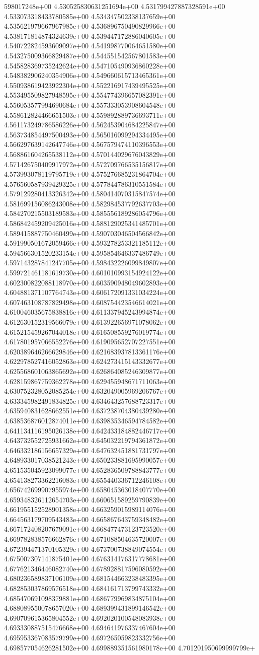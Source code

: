 598017248e+00	4.530525830631251694e+00	4.531799427887328591e+00	4.533073318433780585e+00	4.534347502338137659e+00	4.535621979667967985e+00	4.536896750490829966e+00	4.538171814874324639e+00	4.539447172886040605e+00	4.540722824593609097e+00	4.541998770064651580e+00	4.543275009366829487e+00	4.544551542567801583e+00	4.545828369735242624e+00	4.547105490936860228e+00	4.548382906240354906e+00	4.549660615713465361e+00	4.550938619423922304e+00	4.552216917439495525e+00	4.553495509827948595e+00	4.554774396657082391e+00	4.556053577994690684e+00	4.557333053908604548e+00	4.558612824466651503e+00	4.559892889736693711e+00	4.561173249786586226e+00	4.562453904684225847e+00	4.563734854497500493e+00	4.565016099294334495e+00	4.566297639142647746e+00	4.567579474110396553e+00	4.568861604265538112e+00	4.570144029676043829e+00	4.571426750409917972e+00	4.572709766535156817e+00	4.573993078119795719e+00	4.575276685231864704e+00	4.576560587939429325e+00	4.577844786310551584e+00	4.579129280413326342e+00	4.580414070315847574e+00	4.581699156086243008e+00	4.582984537792637703e+00	4.584270215503189583e+00	4.585556189286054796e+00	4.586842459209425016e+00	4.588129025341485701e+00	4.589415887750460499e+00	4.590703046504566842e+00	4.591990501672059466e+00	4.593278253321185112e+00	4.594566301520233154e+00	4.595854646337486749e+00	4.597143287841247705e+00	4.598432226099849807e+00	4.599721461181619730e+00	4.601010993154924122e+00	4.602300822088118970e+00	4.603590948049602893e+00	4.604881371107764743e+00	4.606172091331034224e+00	4.607463108787829498e+00	4.608754423546614021e+00	4.610046035675838816e+00	4.611337945243994874e+00	4.612630152319566079e+00	4.613922656971078062e+00	4.615215459267044018e+00	4.616508559276019774e+00	4.617801957066552276e+00	4.619095652707227551e+00	4.620389646266629846e+00	4.621683937813361176e+00	4.622978527416052863e+00	4.624273415143332677e+00	4.625568601063865692e+00	4.626864085246309877e+00	4.628159867759362278e+00	4.629455948671711063e+00	4.630752328052085254e+00	4.632049005969206767e+00	4.633345982491834825e+00	4.634643257688723317e+00	4.635940831628662551e+00	4.637238704380439280e+00	4.638536876012874011e+00	4.639835346594784582e+00	4.641134116195026138e+00	4.642433184882446717e+00	4.643732552725931662e+00	4.645032219794361872e+00	4.646332186156657329e+00	4.647632451881731797e+00	4.648933017038521243e+00	4.650233881695990057e+00	4.651535045923099077e+00	4.652836509788843777e+00	4.654138273362216083e+00	4.655440336712246108e+00	4.656742699907955974e+00	4.658045363018407770e+00	4.659348326112654703e+00	4.660651589259790839e+00	4.661955152528901358e+00	4.663259015989114076e+00	4.664563179709543483e+00	4.665867643759348482e+00	4.667172408207679091e+00	4.668477473123723520e+00	4.669782838576662876e+00	4.671088504635720007e+00	4.672394471370105329e+00	4.673700738849074554e+00	4.675007307141875401e+00	4.676314176317778681e+00	4.677621346446082740e+00	4.678928817596080592e+00	4.680236589837106109e+00	4.681544663238483395e+00	4.682853037869576518e+00	4.684161713799743332e+00	4.685470691098379881e+00	4.686779969834875104e+00	4.688089550078657020e+00	4.689399431899146542e+00	4.690709615365804552e+00	4.692020100548083938e+00	4.693330887515476668e+00	4.694641976337467604e+00	4.695953367083579799e+00	4.697265059823332756e+00	4.698577054626281502e+00	4.699889351561980178e+00	4.701201950699999799e+